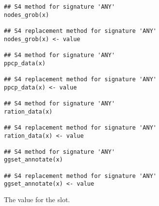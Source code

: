\documentclass[letterpaper]{book}
\begin{document}
\begin{Usage}
\begin{verbatim}
## S4 method for signature 'ANY'
nodes_grob(x)

## S4 replacement method for signature 'ANY'
nodes_grob(x) <- value

## S4 method for signature 'ANY'
ppcp_data(x)

## S4 replacement method for signature 'ANY'
ppcp_data(x) <- value

## S4 method for signature 'ANY'
ration_data(x)

## S4 replacement method for signature 'ANY'
ration_data(x) <- value

## S4 method for signature 'ANY'
ggset_annotate(x)

## S4 replacement method for signature 'ANY'
ggset_annotate(x) <- value
\end{verbatim}
\end{Usage}
%
\begin{Arguments}
\begin{ldescription}
\item[\code{value}] The value for the slot.
\end{ldescription}
\end{Arguments}
%
\end{document}
